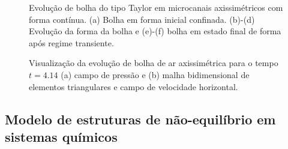 \documentclass[a4paper,portuges,12pt]{article}
\begin{document}
\begin{figure}[h]
\begin{center}
 	\end{center}
	\caption{Evolução de bolha do tipo Taylor em microcanais
	axissimétricos com forma contínua. (a) Bolha em forma inicial
	confinada. (b)-(d) Evolução da forma da bolha e (e)-(f) bolha em
	estado final de forma após regime transiente.} 

	\label{fig:micro1} 
 \end{figure}

 \begin{figure}[h]
 	\begin{center}
 		\hspace{0.7cm}
 	\end{center}
	\caption{Visualização da evolução de bolha de ar axissimétrica para
	o tempo $t=4.14$ (a) campo de pressão e (b) malha bidimensional de
	elementos triangulares e campo de velocidade horizontal.} 
	\label{fig:micro2} 
 \end{figure}


\subsection{Modelo de estruturas de não-equilíbrio em sistemas químicos}
\end{document}
